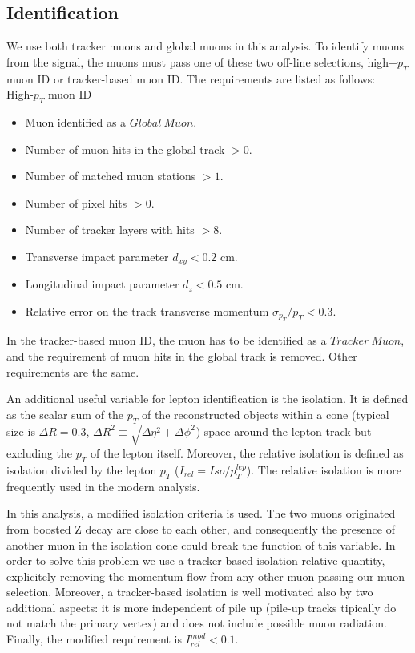 \newpage
\subsection*{Identification}
We use both tracker muons and global muons in this analysis. To identify muons from the signal, the muons must pass one of these two off-line selections, high$-p_{T}$ muon ID or tracker-based muon ID\cite{MuonID}. The requirements are listed as follows:\\

High-$p_{T}$ muon ID
\begin{itemize}
\item Muon identified as a $Global~Muon$.
\item Number of muon hits in the global track $> 0$.
\item Number of matched muon stations $> 1$.
\item Number of pixel hits $> 0$.
\item Number of tracker layers with hits $> 8$.
\item Transverse impact parameter $d_{xy} < 0.2$ cm.
\item Longitudinal impact parameter $d_{z} < 0.5$ cm.
\item Relative error on the track transverse momentum $\sigma_{p_{T}}/p_{T} < 0.3$.\\
\end{itemize}

In the tracker-based muon ID, the muon has to be identified as a $Tracker~Muon$, and the requirement of muon hits in the global track is removed. Other requirements are the same.

An additional useful variable for lepton identification is the isolation. It is defined as the scalar sum of the $p_{T}$ of the reconstructed objects within a cone (typical size is $\Delta R=0.3$, $\Delta R^{2}\equiv\sqrt{\Delta\eta^{2}+\Delta\phi^{2}}$) space around the lepton track but excluding the $p_{T}$ of the lepton itself. Moreover, the relative isolation is defined as isolation divided by the lepton $p_{T}$ ($I_{rel} = Iso/p_{T}^{lep}$). The relative isolation is more frequently used in the modern analysis.

In this analysis, a modified isolation criteria is used. The two muons originated from boosted Z decay are close to each other, and consequently the presence of another muon in the isolation cone could break the function of this variable. In order to solve this problem we use a tracker-based isolation relative quantity, explicitely removing the momentum flow from any other muon passing our muon selection. Moreover, a tracker-based isolation is well motivated also by two additional aspects: it is more independent of pile up (pile-up tracks tipically do not match the primary vertex) and does not include possible muon radiation. Finally, the modified requirement is $I_{rel}^{mod} < 0.1$.\\

